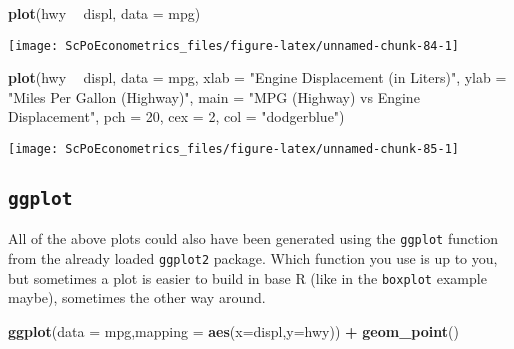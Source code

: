 \documentclass[]{book}
\newenvironment{Shaded}{\begin{snugshade}}{\end{snugshade}}
\newcommand{\DataTypeTok}[1]{\textcolor[rgb]{0.13,0.29,0.53}{#1}}
\newcommand{\DecValTok}[1]{\textcolor[rgb]{0.00,0.00,0.81}{#1}}
\newcommand{\KeywordTok}[1]{\textcolor[rgb]{0.13,0.29,0.53}{\textbf{#1}}}
\newcommand{\NormalTok}[1]{#1}
\newcommand{\OperatorTok}[1]{\textcolor[rgb]{0.81,0.36,0.00}{\textbf{#1}}}
\newcommand{\StringTok}[1]{\textcolor[rgb]{0.31,0.60,0.02}{#1}}
\begin{document}
\begin{Shaded}
\begin{Highlighting}[]
\KeywordTok{plot}\NormalTok{(hwy }\OperatorTok{~}\StringTok{ }\NormalTok{displ, }\DataTypeTok{data =}\NormalTok{ mpg)}
\end{Highlighting}
\end{Shaded}

\begin{center}\texttt{[image: ScPoEconometrics\_files/figure-latex/unnamed-chunk-84-1]} \end{center}

\begin{Shaded}
\begin{Highlighting}[]
\KeywordTok{plot}\NormalTok{(hwy }\OperatorTok{~}\StringTok{ }\NormalTok{displ, }\DataTypeTok{data =}\NormalTok{ mpg,}
     \DataTypeTok{xlab =} \StringTok{"Engine Displacement (in Liters)"}\NormalTok{,}
     \DataTypeTok{ylab =} \StringTok{"Miles Per Gallon (Highway)"}\NormalTok{,}
     \DataTypeTok{main =} \StringTok{"MPG (Highway) vs Engine Displacement"}\NormalTok{,}
     \DataTypeTok{pch  =} \DecValTok{20}\NormalTok{,}
     \DataTypeTok{cex  =} \DecValTok{2}\NormalTok{,}
     \DataTypeTok{col  =} \StringTok{"dodgerblue"}\NormalTok{)}
\end{Highlighting}
\end{Shaded}

\begin{center}\texttt{[image: ScPoEconometrics\_files/figure-latex/unnamed-chunk-85-1]} \end{center}

\hypertarget{ggplot}{%
\subsection{\texorpdfstring{\texttt{ggplot}}{ggplot}}\label{ggplot}}

All of the above plots could also have been generated using the \texttt{ggplot} function from the already loaded \texttt{ggplot2} package. Which function you use is up to you, but sometimes a plot is easier to build in base R (like in the \texttt{boxplot} example maybe), sometimes the other way around.

\begin{Shaded}
\begin{Highlighting}[]
\KeywordTok{ggplot}\NormalTok{(}\DataTypeTok{data =}\NormalTok{ mpg,}\DataTypeTok{mapping =} \KeywordTok{aes}\NormalTok{(}\DataTypeTok{x=}\NormalTok{displ,}\DataTypeTok{y=}\NormalTok{hwy)) }\OperatorTok{+}\StringTok{ }\KeywordTok{geom_point}\NormalTok{()}
\end{Highlighting}
\end{Shaded}
\end{document}
